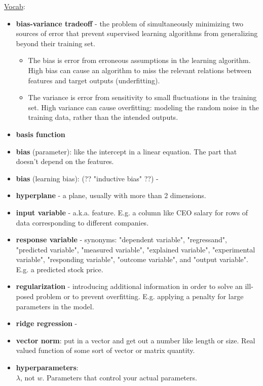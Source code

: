 \underline{Vocab}:
\begin{itemize}
	\item \textbf {bias-variance tradeoff} - the problem of simultaneously minimizing two sources of error that prevent 
			supervised learning algorithms from generalizing beyond their training set.  %
			\begin{itemize}  
				\item The bias is error from erroneous assumptions in the learning algorithm. 
					High bias can cause an algorithm to miss the relevant relations between features 
					and target outputs (underfitting).
				\item The variance is error from sensitivity to small fluctuations in the training set. 
					High variance can cause overfitting: modeling the random noise in the training 
					data, rather than the intended outputs.
			\end{itemize}
	\item \textbf{basis function}
	\item \textbf{bias} (parameter): like the intercept in a linear equation.  The part that doesn't depend on the features. 
	\item \textbf{bias} (learning bias):  (?? "inductive bias" ??)  - 
	\item \textbf{hyperplane} - a plane, usually with more than 2 dimensions. 
	\item \textbf{input variable} - a.k.a. feature.  %
		E.g. a column like CEO salary for rows of data corresponding to different companies.
	\item \textbf{response variable} - synonyms: "dependent variable", "regressand", "predicted variable", "measured variable", "explained variable", "experimental variable", "responding variable", "outcome variable", and "output variable".   E.g. a predicted stock price.   
	\item \textbf{regularization} -  introducing additional information in order to solve an ill-posed problem or to prevent overfitting. 
	E.g. applying a penalty for large parameters in the model. 
	\item \textbf{ridge regression} - 
	\item \textbf{vector norm}: put in a vector and get out a number like length or size.  Real valued function of some sort of vector or matrix quantity. 
	\item \textbf{hyperparameters}: \hfill \\
	$\lambda$, not $w$.  Parameters that control your actual parameters.  \hfill \\ \hfill \\


\end{itemize}
